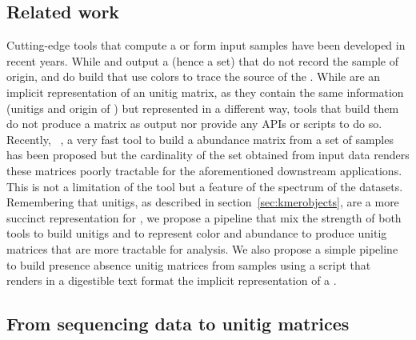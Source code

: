 \subsection{Related work}
Cutting-edge tools that compute a \cdbg or \ccdbgs form input samples have been developed in recent years. While \bcalm and \cuttlefish output a \cdbg (hence a \kmer set) that do not record the sample of origin, \bifrost and \ggcat do build \ccdbgs that use colors to trace the source of the \kmers. While \ccdbgs are an implicit representation of an unitig matrix, as they contain the same information (unitigs and origin of \kmers) but represented in a different way, tools that build them do not produce a matrix as output nor provide any APIs or scripts to do so.\\
Recently, \kmt~\cite{kmtricks}, a very fast tool to build a \kmer abundance matrix from a set of samples has been proposed but the cardinality of the \kmer set obtained from input data renders these matrices poorly tractable for the aforementioned downstream applications. This is not a limitation of the tool but a feature of the \kmer spectrum of the datasets.\\
Remembering that unitigs, as described in section~\ref{sec:kmerobjects}, are a more succinct representation for \kmers, we propose a pipeline that mix the strength of both \cdbg tools to build unitigs and \kmt to represent \kmer color and abundance to produce unitig matrices that are more tractable for analysis. We also propose a simple pipeline to build presence absence unitig matrices from samples using a script that renders in a digestible text format the implicit representation of a \ccdbg.
\subsection{From sequencing data to unitig matrices}
